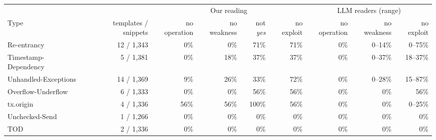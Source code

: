 \begin{tabular}{@{}lrrrrrrrr@{}}
\toprule
 & & \multicolumn{4}{c}{Our reading} & \multicolumn{3}{c}{LLM readers (range)}\\
\cmidrule(lr){3-6}\cmidrule(lr){7-9}
Type & templates / snippets & no operation & no weakness & not \emph{yes} & no exploit & no operation & no weakness & no exploit\\
\midrule
Re-entrancy & 12 / 1,343 & 0\% & 0\% & 71\% & 71\% & 0\% & 0--14\% & 0--75\%\\
Timestamp-Dependency & 5 / 1,381 & 0\% & 18\% & 37\% & 37\% & 0\% & 0--37\% & 18--37\%\\
Unhandled-Exceptions & 14 / 1,369 & 9\% & 26\% & 33\% & 72\% & 0\% & 0--28\% & 15--87\%\\
Overflow-Underflow & 6 / 1,333 & 0\% & 0\% & 56\% & 56\% & 0\% & 0\% & 56\%\\
tx.origin & 4 / 1,336 & 56\% & 56\% & 100\% & 56\% & 0\% & 0\% & 0--25\%\\
Unchecked-Send & 1 / 1,266 & 0\% & 0\% & 0\% & 0\% & 0\% & 0\% & 0\%\\
TOD & 2 / 1,336 & 0\% & 0\% & 0\% & 0\% & 0\% & 0\% & 0\%\\
\bottomrule
\end{tabular}
